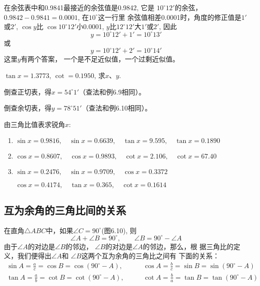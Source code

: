 \begin{solution}
    在余弦表中和0.9841最接近的余弦值是0.9842, 它是
$10^{\circ}12'$的余弦，$0.9842-0.9841=0.0001$, 在$10^{\circ}$这一行里
余弦值相差0.0001时，角度的修正值是$1'$或$2'$, $\cos y$比
$\cos10^{\circ}12'$小0.0001, $y$比$12^{\circ}12'$大$1'$或$2'$, 因此
\[y=10^{\circ}12'+1'=10^{\circ}13'\]
或\[y=10^{\circ}12'+2'=10^{\circ}14'\]
这里$y$有两个答案，
一个是不足近似值，一个过剩近似值。
\end{solution}

\begin{example}
    $\tan x=1.3773$, $\cot=0.1950$, 求$x$、$y$.
\end{example}

\begin{solution}
倒查正切表，得$x=54^{\circ}1'$（查法和例6.9相同）。

倒查余切表，得$y=78^{\circ}51'$（查法和例6.10相同）。
\end{solution}

\begin{ex}
    由三角比值表求锐角$x$:
\begin{enumerate}
    \item $\sin x=0.9816,\quad
    \sin x=0.6639,\quad
    \tan x=9.595,\quad
    \tan x=0.1890$
    \item $\cos x=0.8607,\quad
    \cos x=0.9893,\quad
    \cot x=2.106,\quad
    \cot x=67.40$
    \item $\sin x=0.2476,\quad
    \sin x=0.9709,\quad
    \cos x=0.3372$
    
    $
    \cos x=0.4174,\quad
    \tan x=0.365,\quad
    \cot x=0.1614$
\end{enumerate}
\end{ex}

\subsection{互为余角的三角比间的关系}
\begin{figure}[htp]
    \centering
{}
    \caption{}
\end{figure}

在直角$\triangle ABC$中，如果$\angle C=90^{\circ}$(图6.10), 则
\[\angle A+\angle B=90^{\circ},\qquad \angle B=90^{\circ}-\angle A\]
由于$\angle A$的对边是$\angle B$的邻边，
$\angle B$的对边是$\angle A$的邻边，那么，根
据三角比的定义，我们便得出$\angle A$和
$\angle B$这两个互为余角的三角比之间有
下面的关系：
\[\begin{split}
    \sin A=\frac{a}{c}=\cos B=\cos(90^{\circ}-A),&\qquad \cos A=\frac{b}{c}=\sin B=\sin(90^{\circ}-A)\\
    \tan A=\frac{a}{b}=\cot B=\cot(90^{\circ}-A),&\qquad \cot A=\frac{b}{a}=\tan B=\tan(90^{\circ}-A)\\
\end{split}\]

